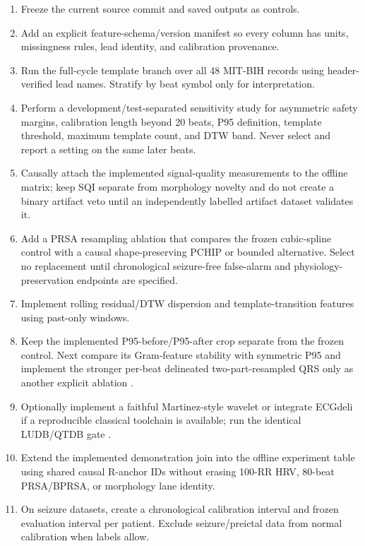 \documentclass[11pt,a4paper]{article}
\begin{document}
\begin{enumerate}
  \item Freeze the current source commit and saved outputs as controls.
  \item Add an explicit feature-schema/version manifest so every column has units, missingness rules, lead identity, and calibration provenance.
  \item Run the full-cycle template branch over all 48 MIT-BIH records using header-verified lead names. Stratify by beat symbol only for interpretation.
  \item Perform a development/test-separated sensitivity study for asymmetric safety margins, calibration length beyond 20 beats, P95 definition, template threshold, maximum template count, and DTW band. Never select and report a setting on the same later beats.
  \item Causally attach the implemented signal-quality measurements to the offline matrix; keep SQI separate from morphology novelty and do not create a binary artifact veto until an independently labelled artifact dataset validates it.
  \item Add a PRSA resampling ablation that compares the frozen cubic-spline control with a causal shape-preserving PCHIP or bounded alternative. Select no replacement until chronological seizure-free false-alarm and physiology-preservation endpoints are specified.
  \item Implement rolling residual/DTW dispersion and template-transition features using past-only windows.
  \item Keep the implemented P95-before/P95-after crop separate from the frozen control. Next compare its Gram-feature stability with symmetric P95 and implement the stronger per-beat delineated two-part-resampled QRS only as another explicit ablation \cite{martinez2004,illanes2007,singh2013,lorenz2021}.
  \item Optionally implement a faithful Martinez-style wavelet or integrate ECGdeli if a reproducible classical toolchain is available; run the identical LUDB/QTDB gate \cite{martinez2004,ecgdeli}.
  \item Extend the implemented demonstration join into the offline experiment table using shared causal R-anchor IDs without erasing 100-RR HRV, 80-beat PRSA/BPRSA, or morphology lane identity.
  \item On seizure datasets, create a chronological calibration interval and frozen evaluation interval per patient. Exclude seizure/preictal data from normal calibration when labels allow.

\end{enumerate}
\end{document}
